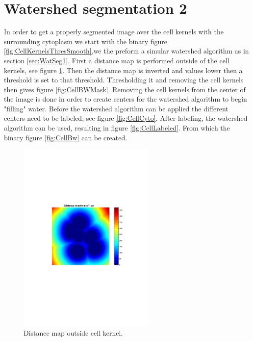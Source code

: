 \documentclass[10pt,twocolumn]{article}
\begin{document}
\section{Watershed segmentation 2}
In order to get a properly segmented image over the cell kernels with the
surrounding cytoplasm we start with the binary figure \ref{fig:CellKernelsThresSmooth},we the preform a
simular watershed algorithm as in section \ref{sec:WatSeg1}. First a distance
map is performed outside of the cell kernels, see figure \ref{fig:CellDist}. Then the distance map is
inverted and values lower then a threshold is set to that threshold.
Thresholding it and removing the cell kernels then gives figure \ref{fig:CellBWMask}.
Removing the cell kernels from the center of the image is done in order to create centers for the
watershed algorithm to begin "filling" water. Before the watershed algorithm can
be applied the different centers need to be labeled, see figure \ref{fig:CellCyto}.
After labeling, the watershed algorithm can be used, resulting in figure \ref{fig:CellLabeled}.
From which the binary figure \ref{fig:CellBw} can be created.

\begin{figure}[ht]
\centering
\includegraphics[width=0.6\textwidth]{Bilder/CellDist.pdf}
\caption{Distance map outside cell kernel.}
\label{fig:CellDist}
\end{figure}
\end{document}
